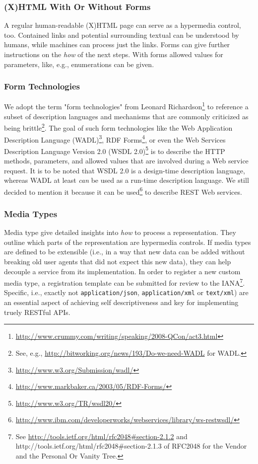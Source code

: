 \documentclass{acm_proc_article-sp}
\begin{document}
\subsubsection{(X)HTML With Or Without Forms}\label{sec:xhtml}
A regular human-readable (X)HTML page can serve as a hypermedia control, too. Contained links and potential surrounding textual can be understood by humans, while machines can process just the links. Forms can give further instructions on the \textit{how} of the next steps. With forms allowed values for parameters, like, e.g., enumerations can be given.

\subsubsection{Form Technologies}\label{sec:formtechs}
We adopt the term "form technologies" from Leonard Richardson\footnote{\url{http://www.crummy.com/writing/speaking/2008-QCon/act3.html}} to reference a subset of description languages and mechanisms that are commonly criticized as being brittle\footnote{See, e.g., \url{http://bitworking.org/news/193/Do-we-need-WADL} for WADL.}. The goal of such form technologies like the Web Application Description Language (WADL)\footnote{\url{http://www.w3.org/Submission/wadl/}}, RDF Forms\footnote{\url{http://www.markbaker.ca/2003/05/RDF-Forms/}}, or even the Web Services Description Language Version 2.0 (WSDL 2.0)\footnote{\url{http://www.w3.org/TR/wsdl20/}} is to describe the HTTP methods, parameters, and allowed values that are involved during a Web service request. It is to be noted that WSDL 2.0 is a design-time description language, whereas WADL at least \textit{can} be used as a run-time description language. We still decided to mention it because it can be used\footnote{\url{http://www.ibm.com/developerworks/webservices/library/ws-restwsdl/}} to describe REST Web services.

\subsubsection{Media Types}\label{sec:mediatypes}
Media type give detailed insights into \textit{how} to process a representation. They outline which parts of the representation are hypermedia controls. If media types are defined to be extensible (i.e., in a way that new data can be added without breaking old user agents that did not expect this new data), they can help decouple a service from its implementation. In order to register a new custom media type, a registration template can be submitted for review to the IANA\footnote{See \url{http://tools.ietf.org/html/rfc2048\#section-2.1.2} and http://tools.ietf.org/html/rfc2048\#section-2.1.3 of RFC2048 for the Vendor and the Personal Or Vanity Tree.}. Specific, i.e., exactly not \texttt{application/json}, \texttt{application/xml} or \texttt{text/xml}) are an essential aspect of achieving self descriptiveness and key for implementing truely RESTful APIs.
\end{document}
